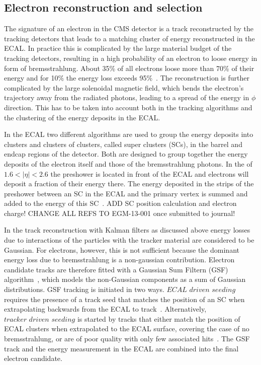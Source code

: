 \subsection{Electron reconstruction and selection}
The signature of an electron in the CMS detector is a track reconstructed by the tracking detectors that leads to a matching cluster of energy reconstructed in the ECAL. In practice this is complicated by the large material budget of the tracking detectors, resulting in a high probability of an electron to loose energy in form of bremsstrahlung. About 35\% of all electrons loose more than 70\% of their energy and for 10\% the energy loss exceeds 95\%~\cite{Baffioni:2006cd}. The reconstruction is further complicated by the large solenoidal magnetic field, which bends the electron's trajectory away from the radiated photons, leading to a spread of the energy in $\phi$ direction. This has to be taken into account both in the tracking algorithms and the clustering of the energy deposits in the ECAL. 

In the ECAL two different algorithms are used to group the energy deposits into clusters and clusters of clusters, called super clusters (SCs), in the barrel and endcap regions of the detector. Both are designed to group together the energy deposits of the electron itself and those of the bremsstrahlung photons. In the of $1.6 < |\eta| < 2.6$ the preshower is located in front of the ECAL and electrons will deposit a fraction of their energy there. The energy deposited in the strips of the preshower between an SC in the ECAL and the primary vertex is summed and added to the energy of this SC~\cite{Anderson:1365024}. ADD SC position calculation and electron charge! CHANGE ALL REFS TO EGM-13-001 once submitted to journal!

In the track reconstruction with Kalman filters as discussed above energy losses due to interactions of the particles with the tracker material are considered to be Gaussian. For electrons, however, this is not sufficient because the dominant energy loss due to bremsstrahlung is a non-gaussian contribution. Electron candidate tracks are therefore fitted with a Gaussian Sum Filtern (GSF) algorithm~\cite{FruhwirtGSFCMS}, which models the non-Gaussian components as a sum of Gaussian distributions. GSF tracking is initiated in two ways. $\textit{ECAL driven seeding}$ requires the presence of a track seed that matches the position of an SC when extrapolating backwards from the ECAL to track~\cite{Baffioni:2006cd}. Alternatively, $\textit{tracker driven seeding}$ is started by tracks that either match the position of ECAL clusters when extrapolated to the ECAL surface, covering the case of no bremsstrahlung, or are of poor quality with only few associated hits~\cite{Chatrchyan:2014fea}. The GSF track and the energy measurement in the ECAL are combined into the final electron candidate. 

